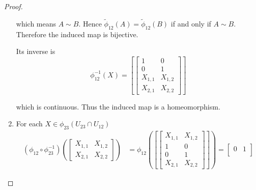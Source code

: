 \begin{proof}
\begin{enumerate}[label={(\alph*)},leftmargin=*]
		      which means \( A \sim B \). Hence \( \tilde{\phi}_{12}(A) = \tilde{\phi}_{12}(B) \) if and only if \( A \sim B \). Therefore the induced map is bijective.

		      Its inverse is
		      \[
			      \phi_{12}^{-1}(X) = \left[\begin{bmatrix}
					      1       & 0       \\
					      0       & 1       \\
					      X_{1,1} & X_{1,2} \\
					      X_{2,1} & X_{2,2}
				      \end{bmatrix}\right]
		      \]

		      which is continuous. Thus the induced map is a homeomorphism.
		\item For each \( X \in \phi_{23}(U_{23} \cap U_{12}) \)
		      \begingroup
		      \allowdisplaybreaks%
		      \begin{align*}
			      (\phi_{12} \circ \phi_{23}^{-1})\left( \begin{bmatrix} X_{1,1} & X_{1,2} \\ X_{2,1} & X_{2,2} \end{bmatrix} \right) & = \phi_{12}\left(\left[\begin{bmatrix}
					                                                                                                                                                   X_{1,1} & X_{1,2} \\
					                                                                                                                                                   1       & 0       \\
					                                                                                                                                                   0       & 1       \\
					                                                                                                                                                   X_{2,1} & X_{2,2}
				                                                                                                                                                   \end{bmatrix}\right]\right) = \begin{bmatrix}
				                                                                                                                                                                                 0       & 1       \\

\end{bmatrix}
\end{align*}
\end{enumerate}
\end{proof}
